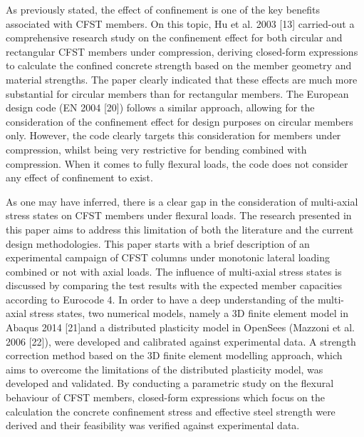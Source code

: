 As previously stated, the effect of confinement is one of the key benefits associated with CFST members. On this topic, Hu et al. 2003 [13] carried-out a comprehensive research study on the confinement effect for both circular and rectangular CFST members under compression, deriving closed-form expressions to calculate the confined concrete strength based on the member geometry and material strengths. The paper clearly indicated that these effects are much more substantial for circular members than for rectangular members. The European design code (EN 2004 [20]) follows a similar approach, allowing for the consideration of the confinement effect for design purposes on circular members only. However, the code clearly targets this consideration for members under compression, whilst being very restrictive for bending combined with compression. When it comes to fully flexural loads, the code does not consider any effect of confinement to exist.

As one may have inferred, there is a clear gap in the consideration of multi-axial stress states on CFST members under flexural loads. The research presented in this paper aims to address this limitation of both the literature and the current design methodologies. This paper starts with a brief description of an experimental campaign of CFST columns under monotonic lateral loading combined or not with axial loads. The influence of multi-axial stress states is discussed by comparing the test results with the expected member capacities according to Eurocode 4. In order to have a deep understanding of the multi-axial stress states, two numerical models, namely a 3D finite element model in Abaqus 2014 [21]and a distributed plasticity model in OpenSees (Mazzoni et al. 2006 [22]), were developed and calibrated against experimental data. A strength correction method based on the 3D finite element modelling approach, which aims to overcome the limitations of the distributed plasticity model, was developed and validated. By conducting a parametric study on the flexural behaviour of CFST members, closed-form expressions which focus on the calculation the concrete confinement stress and effective steel strength were derived and their feasibility was verified against experimental data. 

